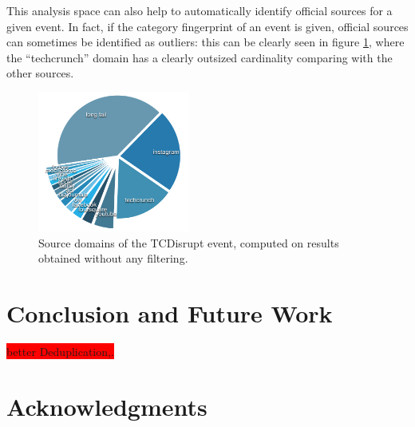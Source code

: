 \documentclass{sig-alternate}
\newcommand{\todo}[1]{\colorbox{red}{#1}}
\begin{document}
This analysis space can also help to automatically identify official sources for a given event. In fact, if the category fingerprint of an event is given, official sources can sometimes be identified as outliers: this can be clearly seen in figure \ref{fig:tcdisrupt_outlier}, where the ``techcrunch'' domain has a clearly outsized cardinality comparing with the other sources.
\begin{figure}[htbp]
  \centering
  \includegraphics[width=5cm]{Figures/tcdisrupt_outlier.png}
  \caption{Source domains of the TCDisrupt event, computed on results obtained without any filtering.}
  \label{fig:tcdisrupt_outlier}
\end{figure}

\section{Conclusion and Future Work}
\label{sec:conclusions}
\todo{better Deduplication,.}

\section{Acknowledgments}
\label{sec:ack}

\nocite{*}


\balancecolumns
\end{document}
